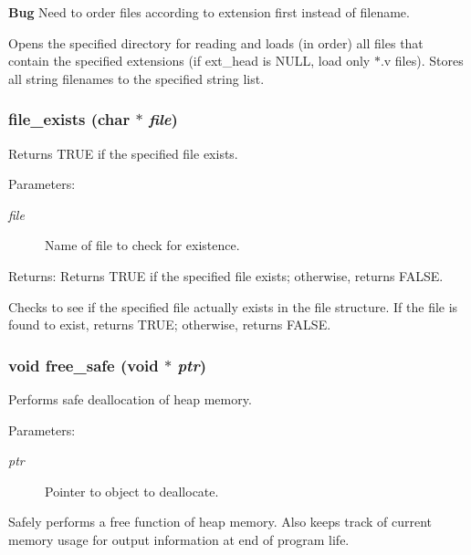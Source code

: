 \begin{Desc}
\item[{\bf Bug}]Need to order files according to extension first instead of filename. \end{Desc}
Opens the specified directory for reading and loads (in order) all files that contain the specified extensions (if ext\_\-head is NULL, load only $\ast$.v files). Stores all string filenames to the specified string list. 
\subsubsection{ file\_\-exists (char $\ast$ {\em file})}\label{util_8h_a7}


Returns TRUE if the specified file exists. 

\begin{Desc}
\item[Parameters:]
\begin{description}
\item[{\em file}]Name of file to check for existence. \end{description}
\end{Desc}
\begin{Desc}
\item[Returns:]Returns TRUE if the specified file exists; otherwise, returns FALSE.\end{Desc}
Checks to see if the specified file actually exists in the file structure. If the file is found to exist, returns TRUE; otherwise, returns FALSE. 
\subsubsection{\setlength{\rightskip}{0pt plus 5cm}void free\_\-safe (void $\ast$ {\em ptr})}\label{util_8h_a15}


Performs safe deallocation of heap memory. 

\begin{Desc}
\item[Parameters:]
\begin{description}
\item[{\em ptr}]Pointer to object to deallocate.\end{description}
\end{Desc}
Safely performs a free function of heap memory. Also keeps track of current memory usage for output information at end of program life. 
